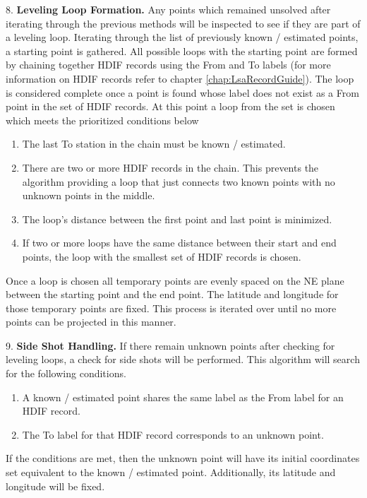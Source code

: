 8. \textbf{Leveling Loop Formation.} Any points which remained unsolved after iterating through the previous methods will be inspected to see if they are part of a leveling loop. Iterating through the list of previously known / estimated points, a starting point is gathered. All possible loops with the starting point are formed by chaining together HDIF records using the From and To labels (for more information on HDIF records refer to chapter \ref{chap:LsaRecordGuide}). The loop is considered complete once a point is found whose label does not exist as a From point in the set of HDIF records. At this point a loop from the set is chosen which meets the prioritized conditions below

\begin{enumerate}
	\item The last To station in the chain must be known / estimated.
	\item There are two or more HDIF records in the chain. This prevents the algorithm providing a loop that just connects two known points with no unknown points in the middle.
	\item The loop's distance between the first point and last point is minimized.
	\item If two or more loops have the same distance between their start and end points, the loop with the smallest set of HDIF records is chosen.
\end{enumerate}

Once a loop is chosen all temporary points are evenly spaced on the NE plane between the starting point and the end point. The latitude and longitude for those temporary points are fixed. This process is iterated over until no more points can be projected in this manner.

9. \textbf{Side Shot Handling.} If there remain unknown points after checking for leveling loops, a check for side shots will be performed. This algorithm will search for the following conditions.

\begin{enumerate}
	\item A known / estimated point shares the same label as the From label for an HDIF record.
	\item The To label for that HDIF record corresponds to an unknown point.
\end{enumerate}

If the conditions are met, then the unknown point will have its initial coordinates set equivalent to the known / estimated point. Additionally, its latitude and longitude will be fixed.

